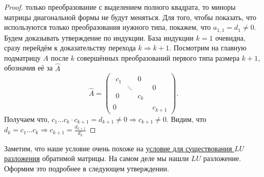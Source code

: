 \begin{proof}
    только преобразование с выделением полного квадрата, то миноры матрицы диагональной
    формы не будут меняться. 
    Для того, чтобы показать, что используются только преобразования
    нужного типа, покажем, что $a_{1,1} = d_1 \neq 0$.
    Будем доказывать утверждение по индукции. База индукции $k = 1$ очевидна,
    сразу перейдём к доказательству перехода $k \Rightarrow k + 1$.
    Посмотрим на главную подматрицу $A$ после $k$ совершённых преобразований первого типа
    размера $k + 1$, обозначив её за $\hat{A}$
    \[
    \hat{A} = 
    \left(\begin{array}{c|c}
            \begin{array}{ccc}
                c_1 & & 0\\
                    &\ddots&\\
                0&&c_k
            \end{array} & 0 \\
            \hline
            0 & c_{k + 1}
    \end{array}\right)
    .\] 
    Получаем что, $c_1\dots c_k \cdot c_{k + 1} = d_{k + 1}\not=0 \Rightarrow c_{k+1}\neq 0$.
    Видим, что $d_k = c_1 \dots c_k \Rightarrow c_{k+1} = \frac{d_{k+1}}{d_{k}}$
\end{proof}
\begin{remark}
    Заметим, что наше условие очень похоже на 
    \hyperref[thm:LU разложение обратимой матрицы]
    {условие для существования $LU$ разложения} обратимой матрицы.
    На самом деле мы нашли $LU$ разложение.
    Оформим это подробнее в следующем утверждении.
\end{remark}
